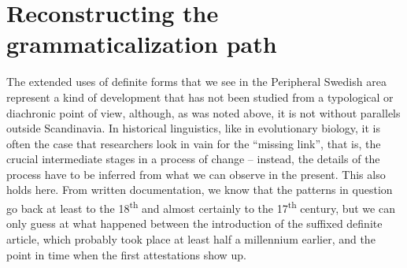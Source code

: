 \begin{stylecaption}

\end{stylecaption}

\begin{figure}[h]

\begin{minipage}{6.5835in}

\end{minipage}

\end{figure}

\begin{stylecaption}
  [Warning: Image ignored] %
 

\end{stylecaption}

\begin{figure}[h]

\begin{minipage}{6.5835in}

\end{minipage}

\end{figure}

\section{\rmfamily\bfseries Reconstructing the grammaticalization path}
\label{bkm:Ref154983462}
\begin{styleBodyTextFirst}
The extended uses of definite forms that we see in the Peripheral Swedish area represent a kind of development that has not been studied from a typological or diachronic point of view, although, as was noted above, it is not without parallels outside Scandinavia. In historical linguistics, like in evolutionary biology, it is often the case that researchers look in vain for the “missing link”, that is, the crucial intermediate stages in a process of change – instead, the details of the process have to be inferred from what we can observe in the present. This also holds here. From written documentation, we know that the patterns in question go back at least to the 18\textsuperscript{th} and almost certainly to the 17\textsuperscript{th} century, but we can only guess at what happened between the introduction of the suffixed definite article, which probably took place at least half a millennium earlier, and the point in time when the first attestations show up. 

\end{styleBodyTextFirst}

